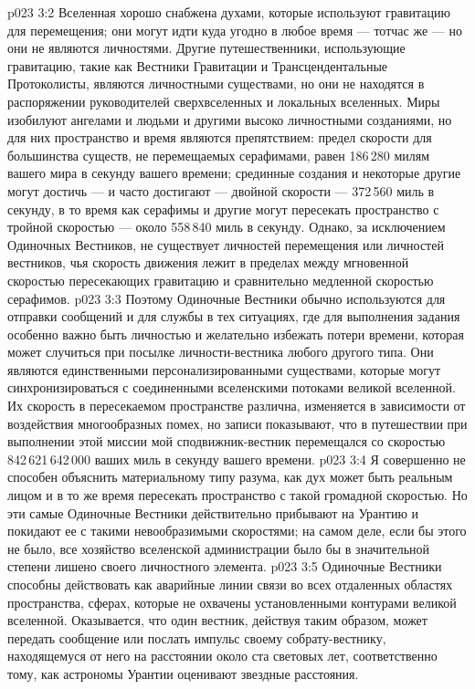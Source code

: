 \vs p023 3:2 \pc Вселенная хорошо снабжена духами, которые используют гравитацию для перемещения; они могут идти куда угодно в любое время --- тотчас же --- но они не являются личностями. Другие путешественники, использующие гравитацию, такие как Вестники Гравитации и Трансцендентальные Протоколисты, являются личностными существами, но они не находятся в распоряжении руководителей сверхвселенных и локальных вселенных. Миры изобилуют ангелами и людьми и другими высоко личностными созданиями, но для них пространство и время являются препятствием: предел скорости для большинства существ, не перемещаемых серафимами, равен 186\,280 милям вашего мира в секунду вашего времени; срединные создания и некоторые другие могут достичь --- и часто достигают --- двойной скорости --- 372\,560 миль в секунду, в то время как серафимы и другие могут пересекать пространство с тройной скоростью --- около 558\,840 миль в секунду. Однако, за исключением Одиночных Вестников, не существует личностей перемещения или личностей вестников, чья скорость движения лежит в пределах между мгновенной скоростью пересекающих гравитацию и сравнительно медленной скоростью серафимов.
\vs p023 3:3 Поэтому Одиночные Вестники обычно используются для отправки сообщений и для службы в тех ситуациях, где для выполнения задания особенно важно быть личностью и желательно избежать потери времени, которая может случиться при посылке личности\hyp{}вестника любого другого типа. Они являются единственными персонализированными существами, которые могут синхронизироваться с соединенными вселенскими потоками великой вселенной. Их скорость в пересекаемом пространстве различна, изменяется в зависимости от воздействия многообразных помех, но записи показывают, что в путешествии при выполнении этой миссии мой сподвижник\hyp{}вестник перемещался со скоростью 842\,621\,642\,000 ваших миль в секунду вашего времени.
\vs p023 3:4 Я совершенно не способен объяснить материальному типу разума, как дух может быть реальным лицом и в то же время пересекать пространство с такой громадной скоростью. Но эти самые Одиночные Вестники действительно прибывают на Урантию и покидают ее с такими невообразимыми скоростями; на самом деле, если бы этого не было, все хозяйство вселенской администрации было бы в значительной степени лишено своего личностного элемента.
\vs p023 3:5 \pc Одиночные Вестники способны действовать как аварийные линии связи во всех отдаленных областях пространства, сферах, которые не охвачены установленными контурами великой вселенной. Оказывается, что один вестник, действуя таким образом, может передать сообщение или послать импульс своему собрату\hyp{}вестнику, находящемуся от него на расстоянии около ста световых лет, соответственно тому, как астрономы Урантии оценивают звездные расстояния.
